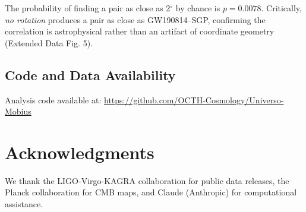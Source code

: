 \documentclass[11pt,a4paper]{article}
\begin{document}
The probability of finding a pair as close as 2$^\circ$ by chance is $p = 0.0078$. Critically, \textit{no rotation} produces a pair as close as GW190814--SGP, confirming the correlation is astrophysical rather than an artifact of coordinate geometry (Extended Data Fig. 5).

\subsection*{Code and Data Availability}
Analysis code available at: \url{https://github.com/OCTH-Cosmology/Universo-Mobius}

\section*{Acknowledgments}
We thank the LIGO-Virgo-KAGRA collaboration for public data releases, the Planck collaboration for CMB maps, and Claude (Anthropic) for computational assistance.
\end{document}
